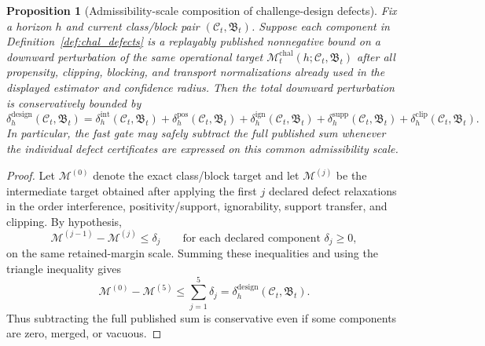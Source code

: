 \documentclass[11pt]{article}
\newtheorem{proposition}[theorem]{Proposition}
\theoremstyle{definition}
\newcommand{\1}{\mathbf{1}}
\begin{document}
\begin{proposition}[Admissibility-scale composition of challenge-design defects]\label{prop:chal_defect_comp}
Fix a horizon $h$ and current class/block pair $(\mathcal C_t,\mathfrak B_t)$. Suppose each component in Definition~\ref{def:chal_defects} is a replayably published nonnegative bound on a downward perturbation of the same operational target $\mathcal M_t^{\mathrm{chal}}(h;\mathcal C_t,\mathfrak B_t)$ after all propensity, clipping, blocking, and transport normalizations already used in the displayed estimator and confidence radius. Then the total downward perturbation is conservatively bounded by
\[
\delta_h^{\mathrm{design}}(\mathcal C_t,\mathfrak B_t)
=
\delta_h^{\mathrm{int}}(\mathcal C_t,\mathfrak B_t)
+\delta_h^{\mathrm{pos}}(\mathcal C_t,\mathfrak B_t)
+\delta_h^{\mathrm{ign}}(\mathcal C_t,\mathfrak B_t)
+\delta_h^{\mathrm{supp}}(\mathcal C_t,\mathfrak B_t)
+\delta_h^{\mathrm{clip}}(\mathcal C_t,\mathfrak B_t).
\]
In particular, the fast gate may safely subtract the full published sum whenever the individual defect certificates are expressed on this common admissibility scale.
\end{proposition}

\begin{proof}
Let $\mathcal M^{(0)}$ denote the exact class/block target and let $\mathcal M^{(j)}$ be the intermediate target obtained after applying the first $j$ declared defect relaxations in the order interference, positivity/support, ignorability, support transfer, and clipping. By hypothesis,
\[
\mathcal M^{(j-1)}-\mathcal M^{(j)}\le \delta_j
\qquad\text{for each declared component }\delta_j\ge 0,
\]
on the same retained-margin scale. Summing these inequalities and using the triangle inequality gives
\[
\mathcal M^{(0)}-\mathcal M^{(5)}\le \sum_{j=1}^5 \delta_j = \delta_h^{\mathrm{design}}(\mathcal C_t,\mathfrak B_t).
\]
Thus subtracting the full published sum is conservative even if some components are zero, merged, or vacuous.
\end{proof}
\end{document}
